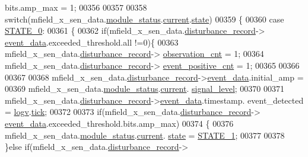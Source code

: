 \begin{DoxyCode}
      bits.amp\_max = 1;
00356 
00357 
00358  \textcolor{keywordflow}{switch}(mfield\_x\_sen\_data.\hyperlink{a00025_adfab5a5d8b45a93dfb13edb24e2b80e3}{module\_status}.\hyperlink{a00019_acf41ffc11da291c2f9f0fcb02ee72b98}{current}.\hyperlink{a00019_a6b8d8e916bc56265a3fd279bd26b6d1b}{state})
00359     \{
00360         \textcolor{keywordflow}{case} \hyperlink{a00021_ad6739dbbe5581cac99b7dc8a5e09949c}{STATE\_0}:
00361         \{
00362             \textcolor{keywordflow}{if}(mfield\_x\_sen\_data.\hyperlink{a00025_ac9b38e2c1d3f1013a88d33506c754152}{disturbance\_record}->
      \hyperlink{a00028_a8c0bda69e71ef674e60da47ad0be9ab0}{event\_data}.exceeded\_threshold.all !=0)\{
00363             mfield\_x\_sen\_data.\hyperlink{a00025_ac9b38e2c1d3f1013a88d33506c754152}{disturbance\_record}->
      \hyperlink{a00028_ad5b0bac02ce266b91b2b52a1c3ea1d78}{observation\_cnt}    = 1;
00364             mfield\_x\_sen\_data.\hyperlink{a00025_ac9b38e2c1d3f1013a88d33506c754152}{disturbance\_record}->
      \hyperlink{a00028_a7397b9d76d4b57500f27bb23d258a18a}{event\_positive\_cnt} = 1;
00365 
00366 
00367 
00368              mfield\_x\_sen\_data.\hyperlink{a00025_ac9b38e2c1d3f1013a88d33506c754152}{disturbance\_record}->\hyperlink{a00028_a8c0bda69e71ef674e60da47ad0be9ab0}{event\_data}.initial\_amp =
00369                      mfield\_x\_sen\_data.\hyperlink{a00025_adfab5a5d8b45a93dfb13edb24e2b80e3}{module\_status}.\hyperlink{a00019_acf41ffc11da291c2f9f0fcb02ee72b98}{current}.
      \hyperlink{a00019_a4070db8eab0ff93e3fbc1df59872f117}{signal\_level};
00370 
00371              mfield\_x\_sen\_data.\hyperlink{a00025_ac9b38e2c1d3f1013a88d33506c754152}{disturbance\_record}->\hyperlink{a00028_a8c0bda69e71ef674e60da47ad0be9ab0}{event\_data}.timestamp.
      event\_detected = \hyperlink{a00021_a2e89c46668b39a17753c238950c9e1ec}{logv}.\hyperlink{a00021_a81f0ce68c2c483fb8df726cc1988d8e8}{tick};
00372 
00373              \textcolor{keywordflow}{if}(mfield\_x\_sen\_data.\hyperlink{a00025_ac9b38e2c1d3f1013a88d33506c754152}{disturbance\_record}->
      \hyperlink{a00028_a8c0bda69e71ef674e60da47ad0be9ab0}{event\_data}.exceeded\_threshold.bits.amp\_max)
00374              \{
00376                 mfield\_x\_sen\_data.\hyperlink{a00025_adfab5a5d8b45a93dfb13edb24e2b80e3}{module\_status}.\hyperlink{a00019_acf41ffc11da291c2f9f0fcb02ee72b98}{current}.
      \hyperlink{a00019_a6b8d8e916bc56265a3fd279bd26b6d1b}{state} = \hyperlink{a00021_a727351838367f27ac0adb9a13422c342}{STATE\_1};
00377 
00378              \}\textcolor{keywordflow}{else} \textcolor{keywordflow}{if}(mfield\_x\_sen\_data.\hyperlink{a00025_ac9b38e2c1d3f1013a88d33506c754152}{disturbance\_record}->

\end{DoxyCode}
